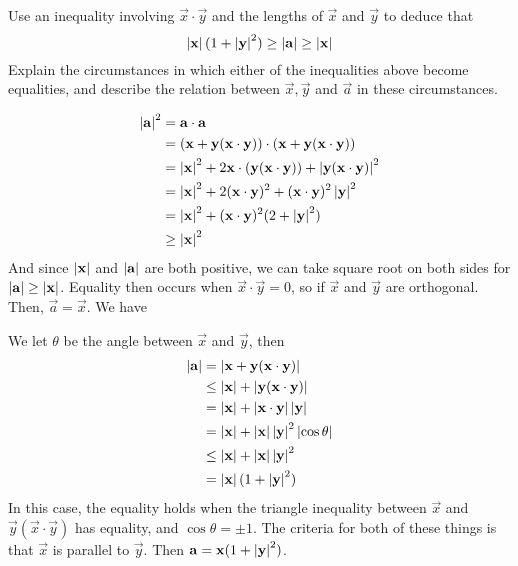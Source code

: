\documentclass[12pt]{article}
\begin{document}
    \begin{subquestion}
        Use an inequality involving $\vec{x}\cdot\vec{y}$ and the
        lengths of $\vec{x}$ and $\vec{y}$ to deduce that
        \[
        \left\lvert \mathbf{x} \right\rvert(1+\left\lvert \mathbf{y} \right\rvert^{2}) \ge \left\lvert \mathbf{a} \right\rvert \ge \left\lvert \mathbf{x} \right\rvert
        \]
        Explain the circumstances in which either of the inequalities
        above become equalities, and describe the relation between
        $\vec{x},\vec{y}$ and $\vec{a}$ in these circumstances.
    \end{subquestion}
    \begin{answer}
        \begin{align*}
            \left\lvert \mathbf{a} \right\rvert^{2} 
            &= \mathbf{a}\cdot\mathbf{a}\\
            &= (\mathbf{x}+\mathbf{y}(\mathbf{x}\cdot\mathbf{y}))\cdot(\mathbf{x}+\mathbf{y}(\mathbf{x}\cdot\mathbf{y}))\\
            &= \left\lvert \mathbf{x} \right\rvert^{2}
            + 2\mathbf{x}\cdot(\mathbf{y}(\mathbf{x}\cdot\mathbf{y})) 
            + \left\lvert \mathbf{y}(\mathbf{x}\cdot\mathbf{y}) \right\rvert^{2}\\
            &= \left\lvert \mathbf{x} \right\rvert^{2} 
            + 2(\mathbf{x}\cdot\mathbf{y})^{2}
            + (\mathbf{x}\cdot\mathbf{y})^{2}\left\lvert \mathbf{y} \right\rvert^{2}\\
            &= \left\lvert \mathbf{x} \right\rvert^{2} + (\mathbf{x}\cdot\mathbf{y})^{2}(2 + \left\lvert \mathbf{y} \right\rvert^{2})\\
            &\ge \left\lvert \mathbf{x} \right\rvert^{2}
        \end{align*}
        And since $\left\lvert \mathbf{x} \right\rvert$ and $\left\lvert \mathbf{a} \right\rvert$ are both positive,
        we can take square root on both sides for $\left\lvert \mathbf{a} \right\rvert \ge \left\lvert \mathbf{x} \right\rvert$.
        Equality then occurs when $\vec{x}\cdot\vec{y} = 0$, so if $\vec{x}$ and $\vec{y}$
        are orthogonal. Then, $\vec{a}=\vec{x}$. We have

        We let $\theta$ be the angle between $\vec{x}$ and $\vec{y}$, then
        \begin{align*}
            \left\lvert \mathbf{a} \right\rvert
            &= \left\lvert \mathbf{x} + \mathbf{y}(\mathbf{x}\cdot\mathbf{y}) \right\rvert\\
            &\le \left\lvert \mathbf{x} \right\rvert + \left\lvert \mathbf{y}(\mathbf{x}\cdot\mathbf{y}) \right\rvert\\
            &= \left\lvert \mathbf{x} \right\rvert + \left\lvert \mathbf{x}\cdot\mathbf{y} \right\rvert\left\lvert \mathbf{y} \right\rvert\\
            &= \left\lvert \mathbf{x} \right\rvert + \left\lvert \mathbf{x} \right\rvert\left\lvert \mathbf{y} \right\rvert^{2}\left\lvert \cos\theta \right\rvert\\
            &\le \left\lvert \mathbf{x} \right\rvert + \left\lvert \mathbf{x} \right\rvert\left\lvert \mathbf{y} \right\rvert^{2}\\ 
            &= \left\lvert \mathbf{x} \right\rvert(1 + \left\lvert \mathbf{y} \right\rvert^{2})
        \end{align*}
        In this case, the equality holds when the
        triangle inequality between $\vec{x}$ and $\vec{y}(\vec{x}\cdot\vec{y})$
        has equality, and $\cos\theta = \pm 1$. The criteria
        for both of these things is that $\vec{x}$ is parallel to $\vec{y}$.
        Then $\mathbf{a}=\mathbf{x}(1+\left\lvert \mathbf{y} \right\rvert^{2})$.
    \end{answer}
\end{document}
